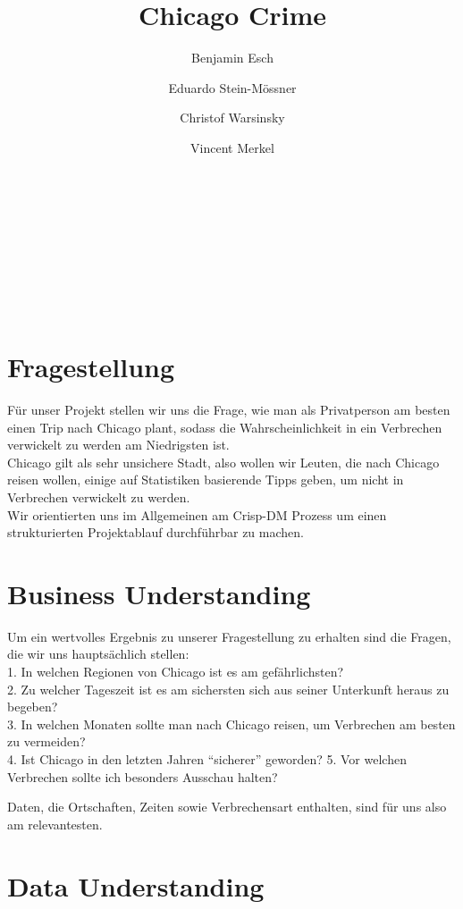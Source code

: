 \documentclass[10pt]{article}
\title{Chicago Crime}
\begin{document}
    \maketitle
    \author[1]{Benjamin Esch}\\
    \author[2]{ Eduardo Stein-Mössner}\\
    \author[3]{Christof Warsinsky}\\
    \author[4]{Vincent Merkel}\\
    \tableofcontents
    \newpage
    

    
    \section{Fragestellung}\label{fragestellung}

    Für unser Projekt stellen wir uns die Frage, wie man als Privatperson am
besten einen Trip nach Chicago plant, sodass die Wahrscheinlichkeit in
ein Verbrechen verwickelt zu werden am Niedrigsten ist.\\
Chicago gilt als sehr unsichere Stadt, also wollen wir Leuten, die nach
Chicago reisen wollen, einige auf Statistiken basierende Tipps geben, um
nicht in Verbrechen verwickelt zu werden.\\
Wir orientierten uns im Allgemeinen am Crisp-DM Prozess um einen
strukturierten Projektablauf durchführbar zu machen.

    \section{Business Understanding}\label{business-understanding}

    Um ein wertvolles Ergebnis zu unserer Fragestellung zu erhalten sind die
Fragen, die wir uns hauptsächlich stellen:\\
1. In welchen Regionen von Chicago ist es am gefährlichsten?\\
2. Zu welcher Tageszeit ist es am sichersten sich aus seiner Unterkunft
heraus zu begeben?\\
3. In welchen Monaten sollte man nach Chicago reisen, um Verbrechen am
besten zu vermeiden?\\
4. Ist Chicago in den letzten Jahren ``sicherer'' geworden? 5. Vor
welchen Verbrechen sollte ich besonders Ausschau halten?

Daten, die Ortschaften, Zeiten sowie Verbrechensart enthalten, sind für
uns also am relevantesten.

    \section{Data Understanding}\label{data-understanding}
\end{document}
